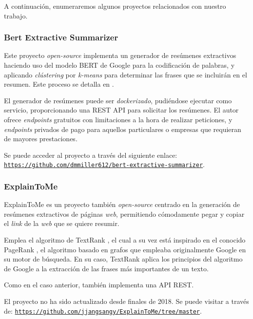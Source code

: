 
A continuación, enumeraremos algunos proyectos relacionados con nuestro trabajo.

\subsubsection{Bert Extractive Summarizer}

Este proyecto \emph{open-source} implementa un generador de resúmenes extractivos haciendo uso del modelo BERT \cite{devlin19} de Google para la codificación de palabras, y aplicando \emph{clústering} por \emph{k-means} para determinar las frases que se incluirán en el resumen. Este proceso se detalla en \cite{miller19}.

El generador de resúmenes puede ser \emph{dockerizado}, pudiéndose ejecutar como servicio, proporcionando una REST API para solicitar los resúmenes. El autor ofrece \emph{endpoints} gratuitos con limitaciones a la hora de realizar peticiones, y \emph{endpoints} privados de pago para aquellos particulares o empresas que requieran de mayores prestaciones.

Se puede acceder al proyecto a través del siguiente enlace: \\
\href{https://github.com/dmmiller612/bert-extractive-summarizer}{\texttt{{\small https://github.com/dmmiller612/bert-extractive-summarizer}}}.


\bigskip
\subsubsection{ExplainToMe}

ExplainToMe es un proyecto también \emph{open-source} centrado en la generación de resúmenes extractivos de páginas \emph{web}, permitiendo cómodamente pegar y copiar el \emph{link} de la \emph{web} que se quiere resumir.

Emplea el algoritmo de TextRank \cite{mihalce04}, el cual a su vez está inspirado en el conocido PageRank \cite{page99}, el algoritmo basado en grafos que empleaba originalmente Google en su motor de búsqueda. En su caso, TextRank aplica los principios del algoritmo de Google a la extracción de las frases más importantes de un texto.

Como en el caso anterior, también implementa una API REST.

El proyecto no ha sido actualizado desde finales de 2018. Se puede visitar a través de:
\href{https://github.com/jjangsangy/ExplainToMe/tree/master}{\texttt{{\small https://github.com/jjangsangy/ExplainToMe/tree/master}}}.


